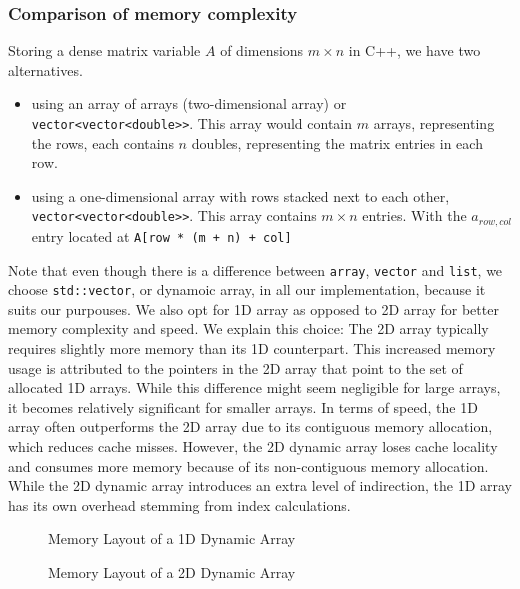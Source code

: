 \subsubsection{Comparison of memory complexity}
Storing a dense matrix variable \( A \) of dimensions \( m \times n \) in C++, we have two alternatives.
\begin{itemize}
    \item using an array of arrays (two-dimensional array) or \texttt{vector<vector<double>>}. This array would contain
          $m$ arrays, representing the rows, each contains $n$ doubles, representing the matrix entries in each row.
    \item using a one-dimensional array with rows stacked next to each other,
          \texttt{vector<vector<double>>}. This array contains $m \times n$ entries.
          With the $a_{row,col}$ entry located at \texttt{A[row * (m + n) + col]}
\end{itemize}
Note that even
though there is a difference between  \texttt{array}, \texttt{vector} and \texttt{list}, we
choose \texttt{std::vector}, or dynamoic array, in all our implementation, because it suits our purpouses.
We also opt for 1D array as opposed to 2D array for better memory complexity and speed.
We explain this choice:
The 2D array typically requires slightly more memory than its 1D counterpart.
This increased memory usage is attributed to the pointers in the 2D array that point to
the set of allocated 1D arrays. While this difference might seem negligible for large arrays,
it becomes relatively significant for smaller arrays. In terms of speed, the 1D array often outperforms
the 2D array due to its contiguous memory allocation, which reduces cache misses.
However, the 2D dynamic array loses cache locality and consumes more memory because of its non-contiguous
memory allocation. While the 2D dynamic array introduces an
extra level of indirection, the 1D array has its own overhead stemming from index calculations.

\begin{figure}[h]
    \centering
    \caption{Memory Layout of a 1D Dynamic Array}
\end{figure}

\begin{figure}[h]
    \centering
    \caption{Memory Layout of a 2D Dynamic Array}
\end{figure}


